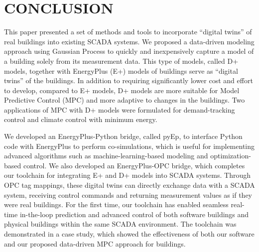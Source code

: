 \section{CONCLUSION}

This paper presented a set of methods and tools to incorporate ``digital twins'' of real buildings into existing SCADA systems.
We proposed a data-driven modeling approach using Gaussian Process to quickly and inexpensively capture a model of a building solely from its measurement data.
This type of models, called D+ models, together with EnergyPlus (E+) models of buildings serve as ``digital twins'' of the buildings.
In addition to requiring significantly lower cost and effort to develop, compared to E+ models, D+ models are more suitable for Model Predictive Control (MPC) and more adaptive to changes in the buildings.
Two applications of MPC with D+ models were formulated for demand-tracking control and climate control with minimum energy.

We developed an EnergyPlus-Python bridge, called pyEp, to interface Python code with EnergyPlus to perform co-simulations, which is useful for implementing advanced algorithms such as machine-learning-based modeling and optimization-based control.
We also developed an EnergyPlus-OPC bridge, which completes our toolchain for integrating E+ and D+ models into SCADA systems.
Through OPC tag mappings, these digital twins can directly exchange data with a SCADA system, receiving control commands and returning measurement values as if they were real buildings.
For the first time, our toolchain has enabled seamless real-time in-the-loop prediction and advanced control of both software buildings and physical buildings within the same SCADA environment.
The toolchain was demonstrated in a case study, which showed the effectiveness of both our software and our proposed data-driven MPC approach for buildings.